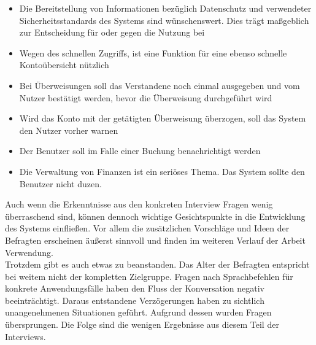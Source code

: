 \begin{itemize}
    \item Die Bereitstellung von Informationen bezüglich Datenschutz und verwendeter Sicherheitsstandards des Systems sind wünschenswert. Dies trägt maßgeblich zur Entscheidung für oder gegen die Nutzung bei
    
    \item Wegen des schnellen Zugriffs, ist eine Funktion für eine ebenso schnelle Kontoübersicht nützlich
    
    \item Bei Überweisungen soll das Verstandene noch einmal ausgegeben und vom Nutzer bestätigt werden, bevor die Überweisung durchgeführt wird
    
    \item Wird das Konto mit der getätigten Überweisung überzogen, soll das System den Nutzer vorher warnen
    
    \item Der Benutzer soll im Falle einer Buchung benachrichtigt werden
    
    \item Die Verwaltung von Finanzen ist ein seriöses Thema. Das System sollte den Benutzer nicht duzen.
\end{itemize}

Auch wenn die Erkenntnisse aus den konkreten Interview Fragen wenig überraschend sind, können dennoch wichtige Gesichtspunkte in die Entwicklung des Systems einfließen. Vor allem die zusätzlichen Vorschläge und Ideen der Befragten erscheinen äußerst sinnvoll und finden im weiteren Verlauf der Arbeit Verwendung.\\
Trotzdem gibt es auch etwas zu beanstanden. Das Alter der Befragten entspricht bei weitem nicht der kompletten Zielgruppe. Fragen nach Sprachbefehlen für konkrete Anwendungsfälle haben den Fluss der Konversation negativ beeinträchtigt. Daraus entstandene Verzögerungen haben zu sichtlich unangenehmenen Situationen geführt. Aufgrund dessen wurden Fragen übersprungen. Die Folge sind die wenigen Ergebnisse aus diesem Teil der Interviews. 

